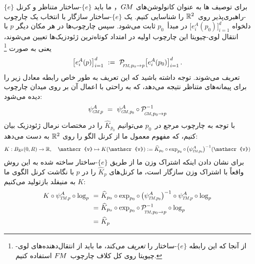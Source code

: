برای توصیف ها به عنوان کانولوشن‌های $G\mkern-1.4muM$， ما باید $\{e\}$-ساختار متناظر و کرنل $\{e\}$-راهبری‌پذیر روی~$\mathbb{R}^2$ را شناسایی کنیم.
یک $\{e\}$-ساختار سازگار با انتخاب یک چارچوب دلخواه $\big[e^A_i(p_0)\big]_{i=1}^d$ در مبدأ~$p_0$ ثابت می‌شود.
سپس چارچوب‌ها در هر مکان دیگر $p$ با انتقال لوی-چیویتا این چارچوب اولیه در امتداد کوتاه‌ترین ژئودزیک‌ها تعیین می‌شوند، یعنی به صورت%
\footnote{
    از آنجا که این رابطه $\{e\}$-ساختار را \emph{تعریف} می‌کند، ما باید از انتقال‌دهنده‌های لوی-چیویتا روی کل کلاف چارچوب~$F\mkern-1.5muM$ استفاده کنیم.
}
\begin{align}
    \big[e^A_i(p) \big]_{i=1}^d\ :=\ 
    \mathcal{P}_{\mkern-2mu\overset{}{\protect\scalebox{.6}{$\!F\!M$}\mkern-2mu,\mkern1mu p_0\to p}}
    \big[e^A_i(p_0)\big]_{i=1}^d \,.
\end{align}
تعریف می‌شوند. توجه داشته باشید که این تعریف به طور خاص رابطه معادل زیر را برای پیمانه‌های متناظر نتیجه می‌دهد، که به راحتی با اعمال آن بر روی میدان چارچوب دیده می‌شود:
\begin{align}\label{eq:PTC_e-structure_gauges}
    \psiGMp^A
    \ =\ 
    \psi_{\protect\scalebox{.6}{$G\!M,\mkern2mu$}\protect\scalebox{.7}{$p_0$}}^A
    \circ
    \mathcal{P}_{\mkern-2mu\overset{}{\protect\scalebox{.6}{$\!G\!M$}\mkern-2mu,\mkern1mu p_0\to p}}^{-1}
\end{align}
با توجه به چارچوب مرجع در~$p_0$ می‌توانیم $\widehat{K}_{p_0}$ را در مختصات نرمال ژئودزیک بیان کنیم، که مفهوم معمول ما از کرنل الگو را روی $\mathbb{R}^2$ به دست می‌دهد:
\begin{align}\label{eq:PTCs_kernel_lift_R2}
    K: B_{\R^2}(0,R) \to \R,
    \quad \mathscr{v} \mapsto K(\mathscr{v}) :=
    \widehat{K}_{p_0} \circ \exp_{p_0} \circ\mkern2mu
    \big( \psi_{\protect\scalebox{.6}{$T\!M,$}\protect\scalebox{.7}{$p_0$}}^A \big)^{-1} (\mathscr{v})
\end{align}
برای نشان دادن اینکه اشتراک وزن ما از طریق $\{e\}$-ساختار ساخته شده به این روش واقعاً با اشتراک وزن \citet{schonsheck2018parallel} سازگار است، ما کرنل‌های $\widehat{K}_p$ را در $p$ با نگاشت کرنل الگوی ما $K$ به منیفلد بازتولید می‌کنیم:
\begin{align}
    K \circ \psiTMp^A \circ \log_p
    \ =&\ \widehat{K}_{p_0} \circ \exp_{p_0} \circ\,
        \big( \psi_{\protect\scalebox{.6}{$T\!M,$}\protect\scalebox{.7}{$p_0$}}^A \big)^{-1}
        \circ \psiTMp^A \circ \log_p \notag \\
    \ =&\ \widehat{K}_{p_0} \circ \exp_{p_0} \circ\,
        \mathcal{P}_{\mkern-2mu\overset{}{\protect\scalebox{.6}{$\!T\!M$}\mkern-2mu,\mkern1mu p_0\to p}}^{-1}
        \circ \log_p \notag \\
    \ =&\ \widehat{K}_p
\end{align}
